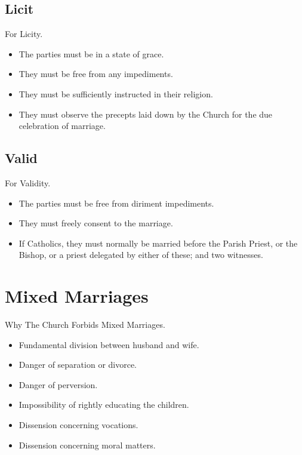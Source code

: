 \documentclass{beamer}
\begin{document}
\subsection{Licit}

\begin{frame}{For Licity.}
\begin{itemize}
 \item   The parties must be in a state of grace.
 \item   They must be free from any impediments.
 \item   They must be sufficiently instructed in their religion.
 \item   They must observe the precepts laid down by the Church for the due
    celebration of marriage.
\end{itemize}
\end{frame}

\subsection{Valid}

\begin{frame}{For Validity.}
\begin{itemize}
  \item   The parties must be free from diriment impediments.


  \item   They must freely consent to the marriage.


  \item   If Catholics, they must normally  be  married  before  the  Parish
    Priest, or the Bishop, or a priest delegated by either  of  these;  and
    two witnesses.

\end{itemize}
\end{frame}

\section{Mixed Marriages}

\begin{frame}{Why The Church Forbids Mixed Marriages.}
\begin{itemize}
 \item   Fundamental division between husband and wife.
 \item   Danger of separation or divorce.
 \item   Danger of perversion.
 \item   Impossibility of rightly educating the children.
 \item   Dissension concerning vocations.
 \item   Dissension concerning moral matters.
\end{itemize}
\end{frame}
\end{document}
